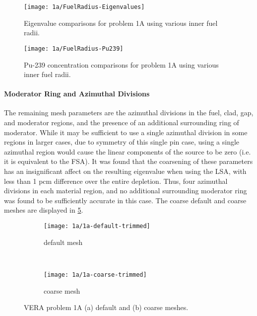 {{{{        \begin{figure}
            \centering
            \texttt{[image: 1a/FuelRadius-Eigenvalues]}
            \caption{Eigenvalue comparisons for problem 1A using various inner fuel radii. \label{fig:LSMOC:1a:FuelRadius:Eigenvalue}}
        \end{figure}
        \begin{figure}
          \centering
          \texttt{[image: 1a/FuelRadius-Pu239]}
          \caption{Pu-239 concentration comparisons for problem 1A using various inner fuel radii. \label{fig:LSMOC:1a:FuelRadius:Pu239}}
        \end{figure}
      }
      \paragraph{Moderator Ring and Azimuthal Divisions} {
        The remaining mesh parameters are the azimuthal divisions in the fuel, clad, gap, and moderator regions, and the presence of an additional surrounding ring of moderator.
        While it may be sufficient to use a single azimuthal division in some regions in larger cases, due to symmetry of this single pin case, using a single azimuthal region would cause the linear components of the source to be zero (i.e. it is equivalent to the \ac{FSA}).
        It was found that the coarsening of these parameters has an insignificant affect on the resulting eigenvalue when using the \ac{LSA}, with less than 1 \ac{pcm} difference over the entire depletion.
        Thus, four azimuthal divisions in each material region, and no additional surrounding moderator ring was found to be sufficiently accurate in this case.
      }
      The coarse default and coarse meshes are displayed in \cref{figs:LSMOC:1A:Mesh}.

      \begin{figure}[h]
          \centering
          \begin{subfigure}[t]{0.45\textwidth}
              \centering
              \texttt{[image: 1a/1a-default-trimmed]}
              \caption{default mesh\label{fig:LSMOC:1a:Default Mesh}}
          \end{subfigure}%
          ~
          \begin{subfigure}[t]{0.45\textwidth}
              \centering
              \texttt{[image: 1a/1a-coarse-trimmed]}
              \caption{coarse mesh\label{fig:LSMOC:1a:Coarse Mesh}}
          \end{subfigure}
          \caption{VERA problem 1A (a) default and (b) coarse meshes.\label{figs:LSMOC:1A:Mesh}}
      \end{figure}
    }

}}
